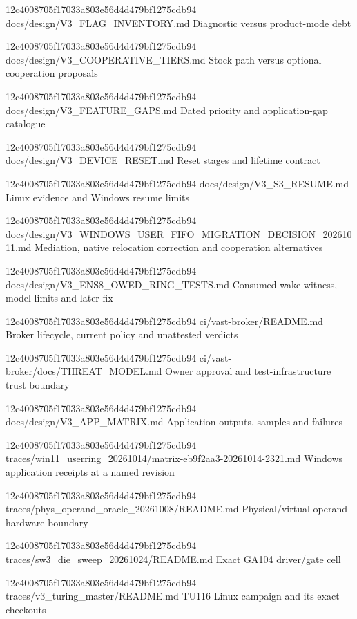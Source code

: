 \begin{description}[style=nextline]
{12c4008705f17033a803e56d4d479bf1275cdb94}
{docs/design/V3_FLAG_INVENTORY.md}
{Diagnostic versus product-mode debt}

{12c4008705f17033a803e56d4d479bf1275cdb94}
{docs/design/V3_COOPERATIVE_TIERS.md}
{Stock path versus optional cooperation proposals}

{12c4008705f17033a803e56d4d479bf1275cdb94}
{docs/design/V3_FEATURE_GAPS.md}
{Dated priority and application-gap catalogue}

{12c4008705f17033a803e56d4d479bf1275cdb94}
{docs/design/V3_DEVICE_RESET.md}
{Reset stages and lifetime contract}

{12c4008705f17033a803e56d4d479bf1275cdb94}
{docs/design/V3_S3_RESUME.md}
{Linux evidence and Windows resume limits}

{12c4008705f17033a803e56d4d479bf1275cdb94}
{docs/design/V3_WINDOWS_USER_FIFO_MIGRATION_DECISION_20261011.md}
{Mediation, native relocation correction and cooperation alternatives}

{12c4008705f17033a803e56d4d479bf1275cdb94}
{docs/design/V3_ENS8_OWED_RING_TESTS.md}
{Consumed-wake witness, model limits and later fix}

{12c4008705f17033a803e56d4d479bf1275cdb94}
{ci/vast-broker/README.md}
{Broker lifecycle, current policy and unattested verdicts}

{12c4008705f17033a803e56d4d479bf1275cdb94}
{ci/vast-broker/docs/THREAT_MODEL.md}
{Owner approval and test-infrastructure trust boundary}

{12c4008705f17033a803e56d4d479bf1275cdb94}
{docs/design/V3_APP_MATRIX.md}
{Application outputs, samples and failures}

{12c4008705f17033a803e56d4d479bf1275cdb94}
{traces/win11_userring_20261014/matrix-eb9f2aa3-20261014-2321.md}
{Windows application receipts at a named revision}

{12c4008705f17033a803e56d4d479bf1275cdb94}
{traces/phys_operand_oracle_20261008/README.md}
{Physical/virtual operand hardware boundary}

{12c4008705f17033a803e56d4d479bf1275cdb94}
{traces/sw3_die_sweep_20261024/README.md}
{Exact GA104 driver/gate cell}

{12c4008705f17033a803e56d4d479bf1275cdb94}
{traces/v3_turing_master/README.md}
{TU116 Linux campaign and its exact checkouts}


\end{description}
